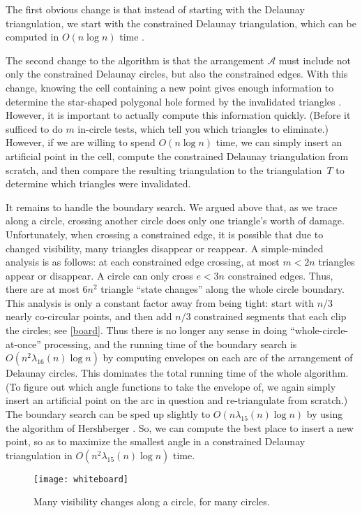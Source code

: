\documentclass{cccg13}
\newcommand\arr{\mathcal A}
\begin{document}
The first obvious change is that instead of starting with the Delaunay triangulation, we start with the constrained Delaunay triangulation, which can be computed in $O(n\log n)$ time \cite{cdt}.

The second change to the algorithm is that the arrangement $\arr$ must include not only the constrained Delaunay circles, but also the constrained edges.  With this change, knowing the cell containing a new point gives enough information to determine the star-shaped polygonal hole formed by the invalidated triangles \cite{orig}.  However, it is important to actually compute this information quickly.  (Before it sufficed to do $m$ in-circle tests, which tell you which triangles to eliminate.)  However, if we are willing to spend $O(n\log n)$ time, we can simply insert an artificial point in the cell, compute the constrained Delaunay triangulation from scratch, and then compare the resulting triangulation to the triangulation~$T$ to determine which triangles were invalidated.

It remains to handle the boundary search.  We argued above that, as we trace along a circle, crossing another circle does only one triangle's worth of damage.  Unfortunately, when crossing a constrained edge, it is possible that due to changed visibility, many triangles disappear or reappear.  A simple-minded analysis is as follows: at each constrained edge crossing, at most $m < 2n$ triangles appear or disappear.  A circle can only cross $e<3n$ constrained edges.  Thus, there are at most $6n^2$ triangle ``state changes'' along the whole circle boundary.  This analysis is only a constant factor away from being tight: start with $n/3$ nearly co-circular points, and then add $n/3$ constrained segments that each clip the circles; see \autoref{board}.  Thus there is no longer any sense in doing ``whole-circle-at-once'' processing, and the running time of the boundary search is $O(n^2\lambda_{16}(n)\log n)$ by computing envelopes on each arc of the arrangement of Delaunay circles.  This dominates the total running time of the whole algorithm.  (To figure out which angle functions to take the envelope of, we again simply insert an artificial point on the arc in question and re-triangulate from scratch.)  The boundary search can be sped up slightly to $O(n\lambda_{15}(n)\log n)$ by using the algorithm of Hershberger \cite{Hersh}.  So, we can compute the best place to insert a new point, so as to maximize the smallest angle in a constrained Delaunay triangulation in $O(n^2\lambda_{15}(n)\log n)$ time.
\begin{figure}
  \centering
  \texttt{[image: whiteboard]}
  \caption{\label{board}Many visibility changes along a circle, for many circles.}
\end{figure}
\end{document}
